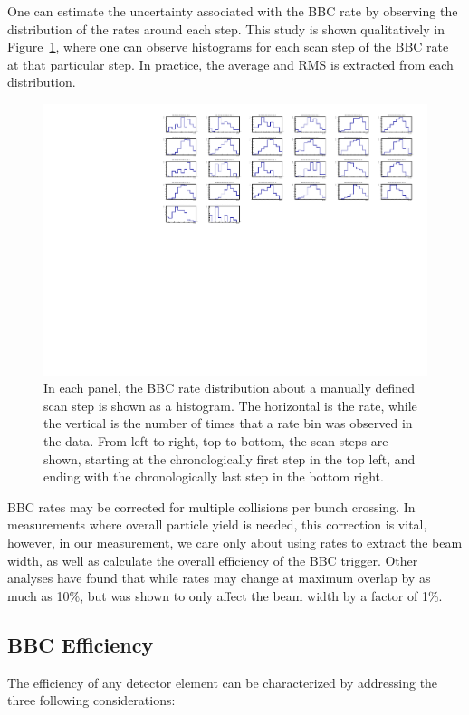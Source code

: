 One can estimate the uncertainty associated with the BBC rate by observing the
distribution of the rates around each step. This study is shown qualitatively in
Figure~\ref{fig:bbc_rate_step_dist}, where one can observe histograms for each
scan step of the BBC rate at that particular step. In practice, the average and
RMS is extracted from each distribution.

\begin{figure}
  \centering
  \includegraphics[width=\linewidth]{./figures/359711_bbc_rate_distribution_per_step.pdf}
  \caption{
    In each panel, the BBC rate distribution about a manually defined scan step
    is shown as a histogram. The horizontal is the rate, while the vertical is
    the number of times that a rate bin was observed in the data. From left to
    right, top to bottom, the scan steps are shown, starting at the
    chronologically first step in the top left, and ending with the
    chronologically last step in the bottom right.
  }
  \label{fig:bbc_rate_step_dist}
\end{figure}

BBC rates may be corrected for multiple collisions per bunch crossing. In
measurements where overall particle yield is needed, this correction is vital,
however, in our measurement, we care only about using rates to extract the beam
width, as well as calculate the overall efficiency of the BBC trigger. Other
analyses have found that while rates may change at maximum overlap by as much as
10\%, but was shown to only affect the beam width by a factor of 1\%.

\clearpage
\subsection{BBC Efficiency}
The efficiency of any detector element can be characterized by addressing the
three following considerations:

